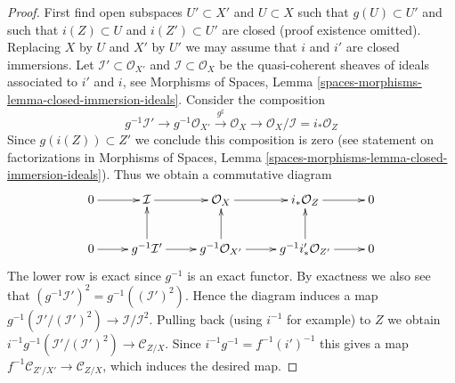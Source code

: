 \documentclass[10pt,a4paper]{amsart}
\theoremstyle{plain}
\theoremstyle{definition}
\theoremstyle{remark}
\numberwithin{equation}{subsection}
\begin{document}
\begin{proof}
First find open subspaces $U' \subset X'$ and $U \subset X$ such that
$g(U) \subset U'$ and such that $i(Z) \subset U$ and $i(Z') \subset U'$
are closed (proof existence omitted). Replacing $X$ by $U$ and $X'$ by
$U'$ we may assume that $i$ and $i'$ are closed immersions.
Let $\mathcal{I}' \subset \mathcal{O}_{X'}$ and
$\mathcal{I} \subset \mathcal{O}_X$ be the quasi-coherent sheaves of
ideals associated to $i'$ and $i$, see
Morphisms of Spaces, Lemma \ref{spaces-morphisms-lemma-closed-immersion-ideals}.
Consider the composition
$$
g^{-1}\mathcal{I}' \to g^{-1}\mathcal{O}_{X'}
\xrightarrow{g^\sharp} \mathcal{O}_X \to
\mathcal{O}_X/\mathcal{I} = i_*\mathcal{O}_Z
$$
Since $g(i(Z)) \subset Z'$ we conclude this composition is zero (see
statement on factorizations in
Morphisms of Spaces,
Lemma \ref{spaces-morphisms-lemma-closed-immersion-ideals}).
Thus we obtain a commutative diagram
$$
\xymatrix{
0 \ar[r] &
\mathcal{I} \ar[r] &
\mathcal{O}_X \ar[r] &
i_*\mathcal{O}_Z \ar[r] &
0 \\
0 \ar[r] &
g^{-1}\mathcal{I}' \ar[r] \ar[u] &
g^{-1}\mathcal{O}_{X'} \ar[r] \ar[u] &
g^{-1}i'_*\mathcal{O}_{Z'} \ar[r] \ar[u] &
0
}
$$
The lower row is exact since $g^{-1}$ is an exact functor.
By exactness we also see that
$(g^{-1}\mathcal{I}')^2 = g^{-1}((\mathcal{I}')^2)$.
Hence the diagram induces a map
$g^{-1}(\mathcal{I}'/(\mathcal{I}')^2) \to \mathcal{I}/\mathcal{I}^2$.
Pulling back (using $i^{-1}$ for example) to $Z$ we obtain
$i^{-1}g^{-1}(\mathcal{I}'/(\mathcal{I}')^2) \to \mathcal{C}_{Z/X}$.
Since $i^{-1}g^{-1} = f^{-1}(i')^{-1}$ this gives a map
$f^{-1}\mathcal{C}_{Z'/X'} \to \mathcal{C}_{Z/X}$, which induces
the desired map.
\end{proof}
\end{document}
